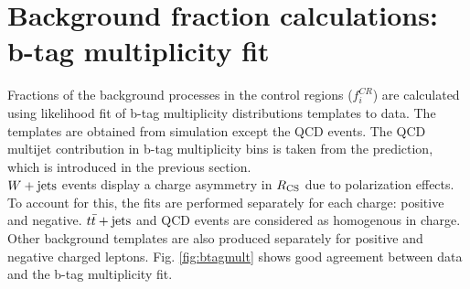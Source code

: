 \section{Background fraction calculations: b-tag multiplicity fit}
\label{sec:bkgcomp}
Fractions of the background processes in the control regions ($f^{CR}_i$) are calculated using likelihood fit of b-tag multiplicity distributions templates to data. The templates are obtained from simulation except the QCD events. The QCD multijet contribution in b-tag multiplicity bins is taken from the prediction, which is introduced in the previous section. \\
$W+\textrm{jets}$ events display a charge asymmetry in $R_{\rm CS}$ due to polarization effects. To account for this, the fits are performed separately for each charge: positive and negative.
$t\bar{t}+\textrm{jets}$ and QCD events are considered as homogenous in charge. Other background templates are also produced separately for positive and negative charged leptons. 
Fig. \ref{fig:btagmult} shows good agreement between data and the b-tag multiplicity fit.
